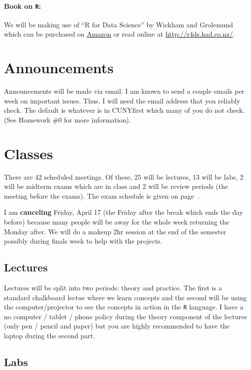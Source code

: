 \documentclass[12pt]{article}
\newcommand{\inred}[1]{\color{red}\textbf{#1} \color{black}}
\newcommand{\qu}[1]{``#1''}
\begin{document}
\paragraph{Book on \texttt{R}:} We will be making use of \qu{R for Data Science} by Wickham and Grolemund which can be purchased on \href{https://www.amazon.com/R-Data-Science-Hadley-Wickham/dp/1491910399}{Amazon} or read online at \url{http://r4ds.had.co.nz/}.


\section*{Announcements}

Announcements will be made via email. I am known to send a couple emails per week on important issues. Thus, I will need the email address that you reliably check. The default is whatever is in CUNYfirst which many of you do not check. (See Homework \#0 for more information).

\section*{Classes}

There are 42 scheduled meetings. Of these, 25 will be lectures, 13 will be labs, 2 will be midterm exams which are in class and 2 will be review periods (the meeting before the exams). The exam schedule is given on page~\pageref{subsec:exam_schedule}.

I am \inred{canceling} Friday, April 17 (the Friday after the break which ends the day before) because many people will be away for the whole week returning the Monday after. We will do a makeup 2hr session at the end of the semester possibly during finals week to help with the projects. 

\subsection*{Lectures}

Lectures will be split into two periods: theory and practice. The first is a standard chalkboard lectue where we learn concepts and the second will be using the computer/projector to see the concepts in action in the \texttt{R} language. I have a no computer / tablet / phone policy during the theory component of the lectures (only pen / pencil and paper) but you are highly recommended to have the laptop during the second part.

\subsection*{Labs}
\end{document}
